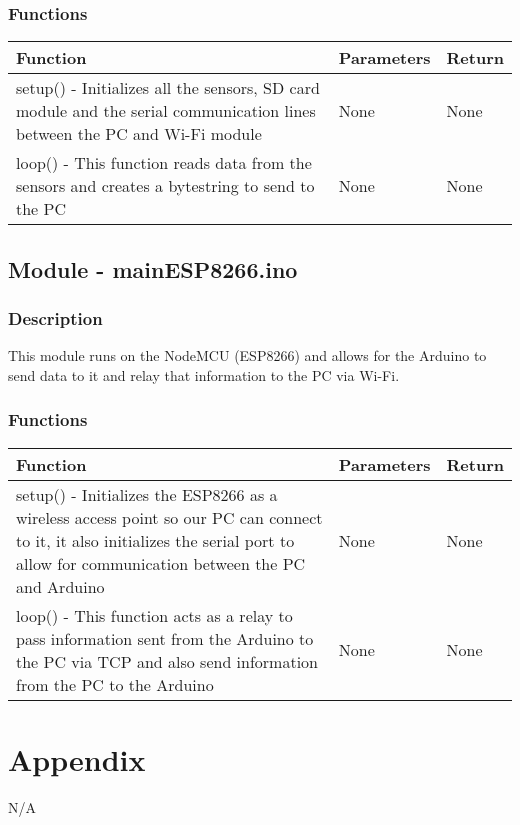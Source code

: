 \documentclass[12pt, titlepage]{article}
\begin{document}
  \subsubsection{Functions}
    \noindent \begin{tabular}{| p{} | p{}| p{}|}
      \hline
      \rowcolor[gray]{0.9}
      Function & Parameters & Return\\
      \hline
      setup() - Initializes all the sensors, SD card module and the serial communication lines between the PC and Wi-Fi module & None & None \\
      \hline
      loop() - This function reads data from the sensors and creates a bytestring to send to the PC & None & None \\
      \hline
      
    \end{tabular}

    \subsection{Module - mainESP8266.ino}

    \subsubsection{Description}
    This module runs on the NodeMCU (ESP8266) and allows for the Arduino to send data to it and relay that information to the PC via Wi-Fi.
    

  \subsubsection{Functions}
    \noindent \begin{tabular}{| p{} | p{}| p{}|}
      \hline
      \rowcolor[gray]{0.9}
      Function & Parameters & Return\\
      \hline
      setup() - Initializes the ESP8266 as a wireless access point so our PC can connect to it, it also initializes the serial port to allow for communication between the PC and Arduino & None & None \\
      \hline
      loop() - This function acts as a relay to pass information sent from the Arduino to the PC via TCP and also send information from the PC to the Arduino & None & None \\
      \hline
      
    \end{tabular}




\newpage



\newpage

\section{Appendix} \label{Appendix}
N/A \\
\end{document}
